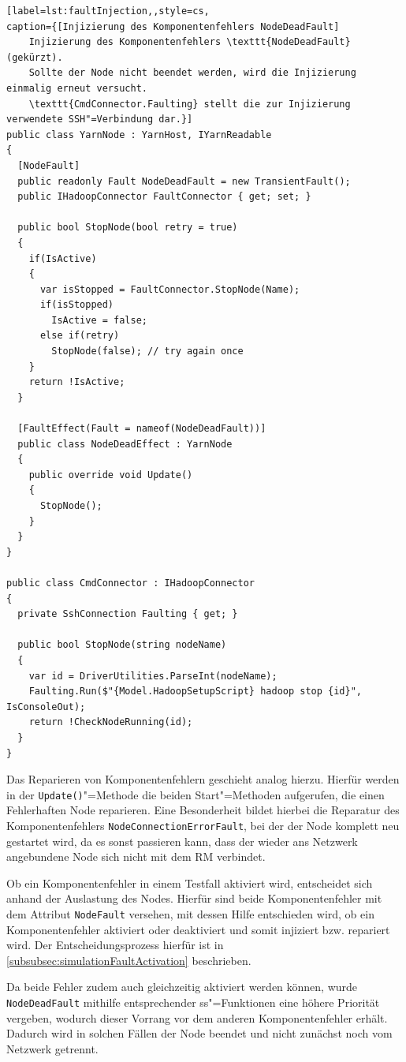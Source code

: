 \begin{lstlisting}[label=lst:faultInjection,,style=cs,
caption={[Injizierung des Komponentenfehlers NodeDeadFault]
    Injizierung des Komponentenfehlers \texttt{NodeDeadFault} (gekürzt).
    Sollte der Node nicht beendet werden, wird die Injizierung einmalig erneut versucht.
    \texttt{CmdConnector.Faulting} stellt die zur Injizierung verwendete SSH"=Verbindung dar.}]
public class YarnNode : YarnHost, IYarnReadable
{
  [NodeFault]
  public readonly Fault NodeDeadFault = new TransientFault();
  public IHadoopConnector FaultConnector { get; set; }
  
  public bool StopNode(bool retry = true)
  {
    if(IsActive)
    {
      var isStopped = FaultConnector.StopNode(Name);
      if(isStopped)
        IsActive = false;
      else if(retry)
        StopNode(false); // try again once
    }
    return !IsActive;
  }
  
  [FaultEffect(Fault = nameof(NodeDeadFault))]
  public class NodeDeadEffect : YarnNode
  {
    public override void Update()
    {
      StopNode();
    }
  }
}

public class CmdConnector : IHadoopConnector
{
  private SshConnection Faulting { get; }
  
  public bool StopNode(string nodeName)
  {
    var id = DriverUtilities.ParseInt(nodeName);
    Faulting.Run($"{Model.HadoopSetupScript} hadoop stop {id}", IsConsoleOut);
    return !CheckNodeRunning(id);
  }
}
\end{lstlisting}

Das Reparieren von Komponentenfehlern geschieht analog hierzu.
Hierfür werden in der \texttt{Update()}"=Methode die beiden Start"=Methoden aufgerufen, die einen Fehlerhaften Node reparieren.
Eine Besonderheit bildet hierbei die Reparatur des Komponentenfehlers \texttt{NodeConnectionErrorFault}, bei der der Node komplett neu gestartet wird, da es sonst passieren kann, dass der wieder ans Netzwerk angebundene Node sich nicht mit dem \ac{RM} verbindet.

Ob ein Komponentenfehler in einem Testfall aktiviert wird, entscheidet sich anhand der Auslastung des Nodes.
Hierfür sind beide Komponentenfehler mit dem Attribut \texttt{NodeFault} versehen, mit dessen Hilfe entschieden wird, ob ein Komponentenfehler aktiviert oder deaktiviert und somit injiziert bzw. repariert wird.
Der Entscheidungsprozess hierfür ist in \cref{subsubsec:simulationFaultActivation} beschrieben.

Da beide Fehler zudem auch gleichzeitig aktiviert werden können, wurde \texttt{NodeDeadFault} mithilfe entsprechender \ac{ss}"=Funktionen eine höhere Priorität vergeben, wodurch dieser Vorrang vor dem anderen Komponentenfehler erhält.
Dadurch wird in solchen Fällen der Node beendet und nicht zunächst noch vom Netzwerk getrennt.

